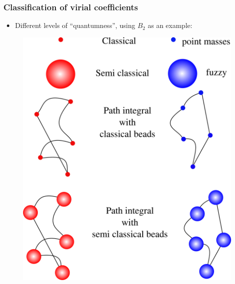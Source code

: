 \documentclass[xcolor=svgnames]{beamer}
\begin{document}
        \begin{frame}
            \frametitle{Classification of virial coefficients}
            \begin{itemize}
                \item Different levels of ``quantumness'', using $B_2$ as an example:
            \end{itemize}
            \begin{figure}
            \centering
            \includegraphics[scale=0.05,keepaspectratio]{quantumLevels.png}
            \end{figure}
        \end{frame}
\end{document}
